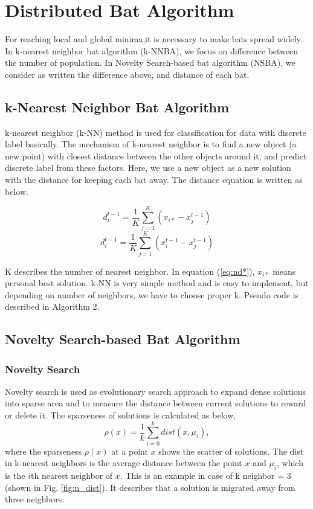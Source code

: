 \documentclass{ies2018}
\begin{document}
\section{Distributed Bat Algorithm}
For reaching local and global minima,it is necessary to make bats spread widely. In k-nearest neighbor bat algorithm (k-NNBA), we focus on difference between the number of population. In Novelty Search-based bat algorithm (NSBA), we consider as written the difference above, and distance of each bat.
\subsection{k-Nearest Neighbor Bat Algorithm}
k-nearest neighbor (k-NN) method is used for classification for data with discrete label basically. The mechanism of k-nearest neighbor is to find a new object (a new point) with closest distance between the other objects around it, and predict discrete label from these factors. Here, we use a new object as a new solution with the distance for keeping each bat away. The distance equation is written as below.

\begin{equation}
d_i^{t-1}=\frac{1}{K}\sum_{j=1}^K {(x_{i*}-x_j^{t-1})}
\label{eq:kd*}
\end{equation}
\begin{equation}
d_i^{t-1}=\frac{1}{K}\sum_{j=1}^K {(x_i^{t-1}-x_j^{t-1})}
\label{eq:kdi}
\end{equation}

K describes the number of nearest neighbor. In equation (\ref{eq:nd*}), ${x_{i*}}$ means personal best solution. k-NN is very simple method and is easy to implement, but depending on number of neighbors, we have to choose proper k. Pseudo code is described in Algorithm 2.


\subsection{Novelty Search-based Bat Algorithm}
\subsubsection{Novelty Search}
Novelty search is used as evolutionary search approach to expand dense solutions into sparse area and to measure the distance between current solutions to reward or delete it. The sparseness of solutions is calculated as below,
\begin{equation}
\rho(x)=\frac{1}{k}\sum_{i=0}^k dist(x,\mu_i),
\label{eq:nov}
\end{equation}
where the sparseness ${\rho(x)}$ at a point ${x}$ shows the scatter of solutions. The dist in k-nearest neighbors is the average distance between the point ${x}$ and ${\mu_i}$, which is the ${i}$th nearest neighbor of ${x}$. This is an example in case of k neighbor = 3 (shown in Fig. \ref{fig:n_dist}). It describes that a solution is migrated away from three neighbors. 
\end{document}
